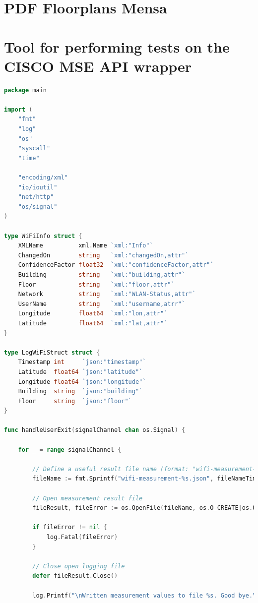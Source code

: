 \documentclass[twoside,11pt,titlepage,a4paper,english,bibliography=totocnumbered,listof=numbered]{scrbook}
\begin{document}
\begin{appendices}

\section{PDF Floorplans Mensa}

\section{Tool for performing tests on the CISCO MSE API wrapper}
\label{appendix:cisco-mse-api-test}

\begin{lstlisting}[language=go]
package main

import (
    "fmt"
    "log"
    "os"
    "syscall"
    "time"

    "encoding/xml"
    "io/ioutil"
    "net/http"
    "os/signal"
)

type WiFiInfo struct {
    XMLName          xml.Name `xml:"Info"`
    ChangedOn        string   `xml:"changedOn,attr"`
    ConfidenceFactor float32  `xml:"confidenceFactor,attr"`
    Building         string   `xml:"building,attr"`
    Floor            string   `xml:"floor,attr"`
    Network          string   `xml:"WLAN-Status,attr"`
    UserName         string   `xml:"username,atrr"`
    Longitude        float64  `xml:"lon,attr"`
    Latitude         float64  `xml:"lat,attr"`
}

type LogWiFiStruct struct {
    Timestamp int     `json:"timestamp"`
    Latitude  float64 `json:"latitude"`
    Longitude float64 `json:"longitude"`
    Building  string  `json:"building"`
    Floor     string  `json:"floor"`
}

func handleUserExit(signalChannel chan os.Signal) {

    for _ = range signalChannel {

        // Define a useful result file name (format: "wifi-measurement-year-month-day-hour-minute-seconds.json")
        fileName := fmt.Sprintf("wifi-measurement-%s.json", fileNameTime)

        // Open measurement result file
        fileResult, fileError := os.OpenFile(fileName, os.O_CREATE|os.O_RDWR|os.O_APPEND, 0666)

        if fileError != nil {
            log.Fatal(fileError)
        }

        // Close open logging file
        defer fileResult.Close()

        log.Printf("\nWritten measurement values to file %s. Good bye.\n", fileName)


\end{lstlisting}
\end{appendices}
\end{document}
